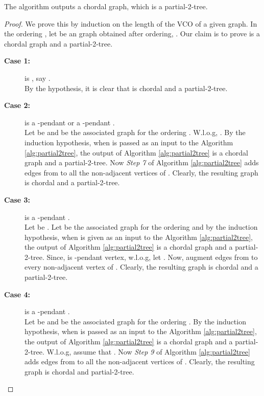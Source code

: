 \documentclass[runningheads]{llncs}
\begin{document}
\begin{theorem}
\label{fill-in}
The algorithm  outputs a chordal graph, which is a partial-2-tree.
\end{theorem}
\begin{proof}
We prove this by induction on the length of the VCO of a given  graph.
In the ordering , let  be an  graph obtained after  ordering, . Our claim is to prove  is a chordal graph and a partial-2-tree.
\begin{description}
\item[\textbf{Case 1:}]  is , say .\\
By the hypothesis, it is clear that  is chordal and a partial-2-tree.

\item[\textbf{Case 2:}]  is a -pendant  or a -pendant .\\
Let  be  and  be the associated graph for the ordering . W.l.o.g, . By the induction hypothesis, when  is passed as an input to the Algorithm \ref{alg:partial2tree}, the output of Algorithm \ref{alg:partial2tree} is a chordal graph and a partial-2-tree. Now \emph{Step 7} of Algorithm \ref{alg:partial2tree} adds edges from  to all the non-adjacent vertices of . Clearly, the resulting graph is chordal and a partial-2-tree.

\item[\textbf{Case 3:}]  is a -pendant .\\
Let  be . Let  be the associated graph for the ordering  and by the induction hypothesis, when  is given as an input to the Algorithm \ref{alg:partial2tree}, the output of Algorithm \ref{alg:partial2tree} is a chordal graph and a partial-2-tree. Since,  is -pendant vertex, w.l.o.g, let . Now, augment edges from  to every non-adjacent vertex of . Clearly, the resulting graph is chordal and a partial-2-tree.

\item[\textbf{Case 4:}]  is a -pendant .\\
Let  be  and  be the associated graph for the ordering . By the induction hypothesis, when  is passed as an input to the Algorithm \ref{alg:partial2tree}, the output of Algorithm \ref{alg:partial2tree} is a chordal graph and a partial-2-tree. W.l.o.g, assume that . Now \emph{Step 9} of Algorithm \ref{alg:partial2tree} adds edges from  to all the non-adjacent vertices of . Clearly, the resulting graph is chordal and partial-2-tree. 
\end{description}
\end{proof}
\end{document}
